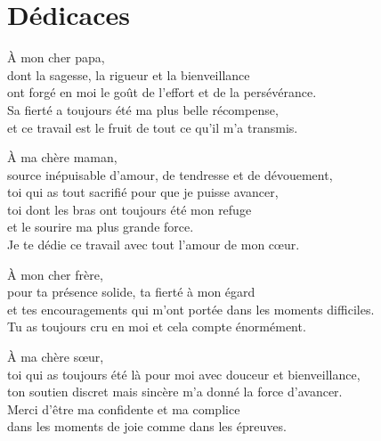 \chapter*{Dédicaces}


\begin{center}
\begin{minipage}{0.9\textwidth}
\small
\itshape
{}

À mon cher papa,\\
dont la sagesse, la rigueur et la bienveillance\\
ont forgé en moi le goût de l'effort et de la persévérance.\\
Sa fierté a toujours été ma plus belle récompense,\\
et ce travail est le fruit de tout ce qu'il m'a transmis.\\

\vspace{0.1cm}

À ma chère maman,\\
source inépuisable d'amour, de tendresse et de dévouement,\\
toi qui as tout sacrifié pour que je puisse avancer,\\
toi dont les bras ont toujours été mon refuge\\
et le sourire ma plus grande force.\\
Je te dédie ce travail avec tout l'amour de mon cœur.\\

\vspace{0.1cm}

À mon cher frère,\\
pour ta présence solide, ta fierté à mon égard\\
et tes encouragements qui m'ont portée dans les moments difficiles.\\
Tu as toujours cru en moi et cela compte énormément.\\

\vspace{0.1cm}

À ma chère sœur,\\
toi qui as toujours été là pour moi avec douceur et bienveillance,\\
ton soutien discret mais sincère m'a donné la force d'avancer.\\
Merci d'être ma confidente et ma complice\\
dans les moments de joie comme dans les épreuves.\\


\end{minipage}
\end{center}

